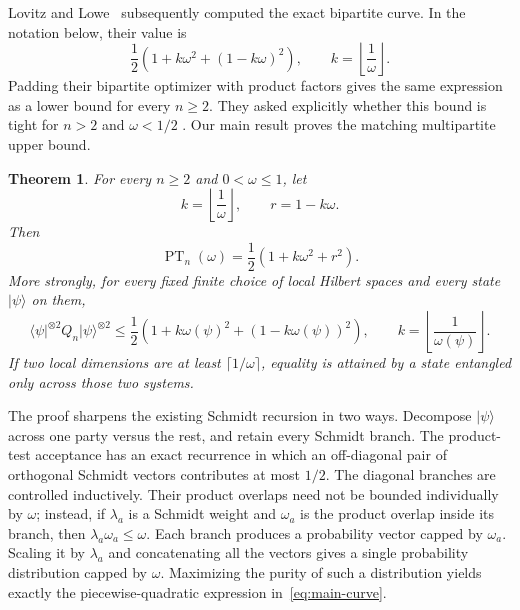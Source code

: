 \documentclass[11pt]{article}
\newtheorem{theorem}{Theorem}[section]
\theoremstyle{definition}
\theoremstyle{remark}
\newcommand{\PT}{\operatorname{PT}}
\newcommand{\ket}[1]{\lvert #1\rangle}
\newcommand{\bra}[1]{\langle #1\rvert}
\begin{document}
Lovitz and Lowe~\cite[Corollary~6.3]{LovitzLowe26} subsequently computed
the exact bipartite curve.  In the notation below, their value is
\begin{equation}\label{eq:LL-candidate}
  \frac12\left(1+k\omega^2+(1-k\omega)^2\right),
  \qquad k=\left\lfloor\frac1\omega\right\rfloor.
\end{equation}
Padding their bipartite optimizer with product factors gives the same
expression as a lower bound for every $n\geq2$.  They asked explicitly
whether this bound is tight for $n>2$ and $\omega<1/2$
\cite[Remark~6.4]{LovitzLowe26}.  Our main result proves the matching
multipartite upper bound.

\begin{theorem}\label{thm:main}
For every $n\geq2$ and $0<\omega\leq1$, let
\[
  k=\left\lfloor\frac1\omega\right\rfloor,
  \qquad r=1-k\omega.
\]
Then
\begin{equation}\label{eq:main-curve}
  \PT_n(\omega)=\frac12\left(1+k\omega^2+r^2\right).
\end{equation}
More strongly, for every fixed finite choice of local Hilbert spaces and
every state $\ket\psi$ on them,
\begin{equation}\label{eq:fixed-dimensional-upper}
  \bra{\psi}^{\otimes2}Q_n\ket{\psi}^{\otimes2}
  \leq
  \frac12\left(1+k\omega(\psi)^2+
                   (1-k\omega(\psi))^2\right),
  \qquad k=\left\lfloor\frac1{\omega(\psi)}\right\rfloor.
\end{equation}
If two local dimensions are at least $\lceil1/\omega\rceil$, equality is
attained by a state entangled only across those two systems.
\end{theorem}

The proof sharpens the existing Schmidt recursion in two ways.  Decompose
$\ket\psi$ across one party versus the rest, and retain every Schmidt
branch.  The product-test acceptance has an exact recurrence in which an
off-diagonal pair of orthogonal Schmidt vectors contributes at most $1/2$.
The diagonal branches are controlled inductively.  Their product overlaps
need not be bounded individually by $\omega$; instead, if $\lambda_a$ is a
Schmidt weight and $\omega_a$ is the product overlap inside its branch,
then $\lambda_a\omega_a\leq\omega$.  Each branch produces a probability
vector capped by $\omega_a$.  Scaling it by $\lambda_a$ and concatenating
all the vectors gives a single probability distribution capped by
$\omega$.  Maximizing the purity of such a distribution yields exactly the
piecewise-quadratic expression in~\eqref{eq:main-curve}.
\end{document}
